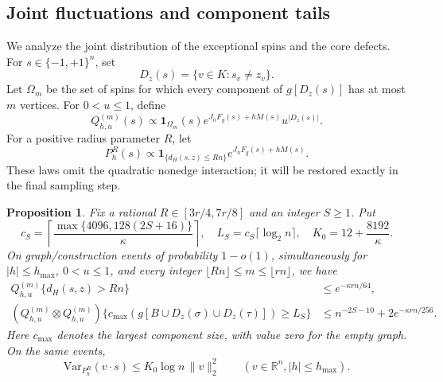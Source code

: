 \documentclass[11pt]{article}
\newcommand{\Var}{\mathrm{Var}}
\def\R{\mathbb{R}}
\newtheorem{proposition}[thm]{Proposition}
\numberwithin{equation}{section}
\begin{document}
\subsection{Joint fluctuations and component tails}

We analyze the joint distribution of the exceptional spins and the core defects. For $s\in\{-1,+1\}^n$, set
\[
    D_z(s)=\{v\in K:s_v\ne z_v\}.
\]
Let $\Omega_m$ be the set of spins for which every component of $g[D_z(s)]$ has at most $m$ vertices. For $0<u\le1$, define
\begin{equation}\label{ph:gas}
 Q_{h,u}^{(m)}(s)\propto
    \mathbf1_{\Omega_m}(s)e^{J_nF_g(s)+hM(s)}u^{|D_z(s)|}.
\end{equation}
For a positive radius parameter $R$, let
\begin{equation}\label{ph:ball_law}
    P_h^R(s)\propto
       \mathbf1_{\{d_H(s,z)\le Rn\}}e^{J_nF_g(s)+hM(s)}.
\end{equation}
These laws omit the quadratic nonedge interaction; it will be restored exactly in the final sampling step.

\begin{proposition}\label{ph:geometry}
Fix a rational $R\in[3r/4,7r/8]$ and an integer $S\ge1$. Put
\[
 c_S=\left\lceil\frac{\max\{4096,128(2S+16)\}}{\kappa}\right\rceil,
 \quad L_S=c_S\lceil\log_2n\rceil,
 \quad K_0=12+\frac{8192}{\kappa}.
\]
On graph/construction events of probability $1-o(1)$, simultaneously for $|h|\le h_{\max}$, $0<u\le1$, and every integer $\lfloor Rn\rfloor\le m\le\lfloor rn\rfloor$, we have
\begin{align}
 Q_{h,u}^{(m)}\{d_H(s,z)>Rn\}&\le e^{-\kappa rn/64},\label{ph:ball_tail}\\
 (Q_{h,u}^{(m)}\otimes Q_{h,u}^{(m)})
 \{c_{\max}(g[B\cup D_z(\sigma)\cup D_z(\tau)])\ge L_S\}
 &\le n^{-2S-10}+2e^{-\kappa rn/256}.\label{ph:pair_tail}
\end{align}
Here $c_{\max}$ denotes the largest component size, with value zero for the empty graph. On the same events,
\begin{equation}\label{ph:susceptibility}
    \Var_{P_h^R}(v\cdot s)\le K_0\log n\,\|v\|_2^2
    \qquad(v\in\R^n, |h|\le h_{\max}).
\end{equation}
\end{proposition}
\end{document}
